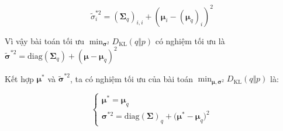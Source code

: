\documentclass[14pt, a4paper]{article}
\numberwithin{equation}{section}
\numberwithin{figure}{section}
\numberwithin{dl}{section}
\numberwithin{md}{section}
\numberwithin{bd}{section}
\numberwithin{dn}{section}
\numberwithin{hq}{section}
\begin{document}
    \begin{equation}
        \tilde{\sigma}_i^{\ast 2} = (\boldsymbol{\Sigma}_q)_{i, i} + (\boldsymbol{\mu}_i - (\boldsymbol{\mu}_q)_i)^2
    \end{equation}

    Vì vậy bài toán tối ưu $\displaystyle\min_{\boldsymbol{\sigma}^2} D_{\mathrm{KL}}(q \Vert p)$ có nghiệm tối ưu là $\tilde{\boldsymbol{\sigma}}^{\ast 2}=\mathrm{diag}(\boldsymbol{\Sigma}_q) + (\boldsymbol{\mu} - \boldsymbol{\mu}_q)^2$

    Kết hợp $\boldsymbol{\mu}^{\ast}$ và $\tilde{\boldsymbol{\sigma}}^{\ast 2}$, ta có nghiệm tối ưu của bài toán $\displaystyle \min_{\boldsymbol{\mu}, \boldsymbol{\sigma}^2} D_{\mathrm{KL}} (q \Vert p)$ là:
    
    \begin{equation}
        \begin{cases}
            \boldsymbol{\mu}^{\ast} = \boldsymbol{\mu}_q \\
            \boldsymbol{\sigma}^{\ast 2} = \mathrm{diag} (\boldsymbol{\Sigma})_q + \big( \boldsymbol{\mu}^{\ast} - \boldsymbol{\mu}_q \big)^2
        \end{cases}     
    \end{equation}
\end{document}
